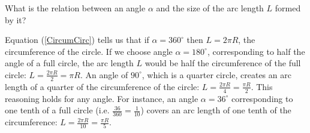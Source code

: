 \noindent What is the relation between an angle $\alpha$ and the size of the arc length $L$ formed by it?
\begin{center}
\end{center}
\noindent Equation (\ref{CircumCirc}) tells us that if $\alpha=360^{\circ}$ then $L=2\pi R$, the circumference of the circle. If we choose angle $\alpha=180^{\circ}$, corresponding to half the angle of a full circle, the arc length $L$ would be half the circumference of the full circle: $L=\frac{2 \pi R}{2} = \pi R$. An angle of $90^{\circ}$, which is a quarter circle, creates an arc length of a quarter of the circumference of the circle: $L = \frac{2 \pi R}{4} = \frac{\pi R}{2}$. This reasoning holds for any angle. For instance, an angle $\alpha = 36^{\circ}$ corresponding to one tenth of a full circle (i.e. $\frac{36}{360} = \frac{1}{10}$) covers an arc length of one tenth of the circumference: $L = \frac{2 \pi R}{10} = \frac{\pi R}{5}$.\\

